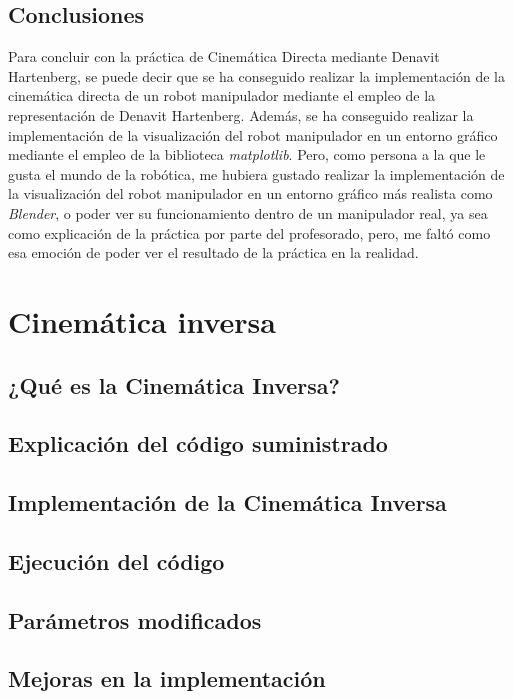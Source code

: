 \documentclass[11pt]{report}
\begin{document}
\section{Conclusiones}

Para concluir con la práctica de Cinemática Directa mediante Denavit Hartenberg, se puede decir que se ha conseguido realizar la implementación de la cinemática directa de un robot manipulador mediante el empleo de la representación de Denavit Hartenberg. Además, se ha conseguido realizar la implementación de la visualización del robot manipulador en un entorno gráfico mediante el empleo de la biblioteca \emph{matplotlib}. Pero, como persona a la que le gusta el mundo de la robótica, me hubiera gustado realizar la implementación de la visualización del robot manipulador en un entorno gráfico más realista como \emph{Blender}, o poder ver su funcionamiento dentro de un manipulador real, ya sea como explicación de la práctica por parte del profesorado, pero, me faltó como esa emoción de poder ver el resultado de la práctica en la realidad.

\chapter{Cinemática inversa}

\section{¿Qué es la Cinemática Inversa?}

\section{Explicación del código suministrado}

\section{Implementación de la Cinemática Inversa}

\section{Ejecución del código}

\section{Parámetros modificados}

\section{Mejoras en la implementación}
\end{document}
